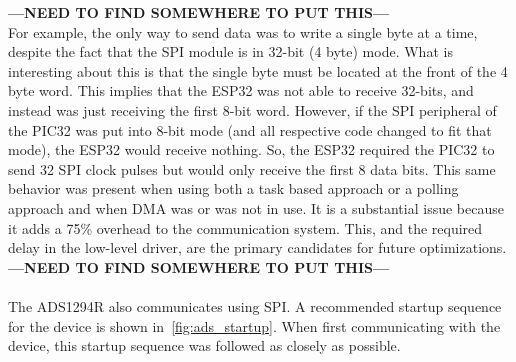 \textbf{---NEED TO FIND SOMEWHERE TO PUT THIS---}\\
For example, the only way to send data was to write a single byte at a time, despite the fact that the SPI module is in 32-bit (4 byte) mode.
What is interesting about this is that the single byte must be located at the front of the 4 byte word.
This implies that the ESP32 was not able to receive 32-bits, and instead was just receiving the first 8-bit word.
However, if the SPI peripheral of the PIC32 was put into 8-bit mode (and all respective code changed to fit that mode),
the ESP32 would receive nothing.
So, the ESP32 required the PIC32 to send 32 SPI clock pulses but would only receive the first 8 data bits.
This same behavior was present when using both a task based approach or a polling approach and when DMA was or was not in use.
It is a substantial issue because it adds a 75\% overhead to the communication system.
This, and the required delay in the low-level driver, are the primary candidates for future optimizations.\\
\textbf{---NEED TO FIND SOMEWHERE TO PUT THIS---}\\\\

The ADS1294R also communicates using SPI.
A recommended startup sequence for the device is shown in~\autoref{fig:ads_startup}.
When first communicating with the device, this startup sequence was followed as closely as possible.

